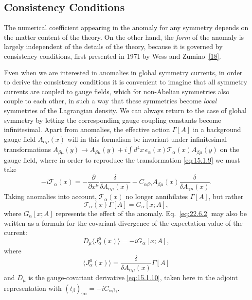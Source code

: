 \subsection{Consistency Conditions}
\label{sec:22.6}

The numerical coefficient appearing in the anomaly for any symmetry
depends on the matter content of the theory. On the other hand, the
\emph{form} of the anomaly is largely independent of the details of the
theory, because it is governed by consistency conditions, first presented
in 1971 by Wess and Zumino~\hyperref[ch22-ref-18]{[18]}.

Even when we are interested in anomalies in global symmetry currents, in
order to derive the consistency conditions it is convenient to imagine
that all symmetry currents are coupled to gauge fields, which for
non-Abelian symmetries also couple to each other, in such a way that these
symmetries become \emph{local} symmetries of the Lagrangian density. We can
always return to the case of global symmetry by letting the corresponding
gauge coupling constants become infinitesimal. Apart from anomalies, the
effective action $\Gamma[A]$ in a background gauge field
$A_{\alpha\mu}(x)$ will in this formalism be invariant under infinitesimal
transformations
$A_{\beta\mu}(y)\rightarrow A_{\beta\mu}(y)
+i\int d^4x\,\epsilon_\alpha(x)\mathcal T_\alpha(x)A_{\beta\mu}(y)$
on the gauge field, where in order to reproduce the transformation
\eqref{eq:15.1.9} we must take
\begin{equation}
 -i\mathcal T_\alpha(x)
 =-\frac{\partial}{\partial x^\mu}
 \frac{\delta}{\delta A_{\alpha\mu}(x)}
 -C_{\alpha\beta\gamma}A_{\beta\mu}(x)
 \frac{\delta}{\delta A_{\gamma\mu}(x)}.
 \tag{22.6.1}\label{eq:22.6.1}
\end{equation}
Taking anomalies into account, $\mathcal T_\alpha(x)$ no longer annihilates
$\Gamma[A]$, but rather
\begin{equation}
 \mathcal T_\alpha(x)\Gamma[A]=G_\alpha[x;A],
 \tag{22.6.2}\label{eq:22.6.2}
\end{equation}
where $G_\alpha[x;A]$ represents the effect of the anomaly.
Eq.~\eqref{eq:22.6.2} may also be written as a formula for the covariant
divergence of the expectation value of the current:
\begin{equation}
 D_\mu\langle J^\mu_\alpha(x)\rangle=-iG_\alpha[x;A],
 \tag{22.6.3}\label{eq:22.6.3}
\end{equation}
where
\begin{equation}
 \langle J^\mu_\alpha(x)\rangle
 =\frac{\delta}{\delta A_{\alpha\mu}(x)}\Gamma[A]
 \tag{22.6.4}\label{eq:22.6.4}
\end{equation}
and $D_\mu$ is the gauge-covariant derivative \eqref{eq:15.1.10}, taken
here in the adjoint representation with
$(t_\beta)_{\gamma\alpha}=-iC_{\alpha\beta\gamma}$.

